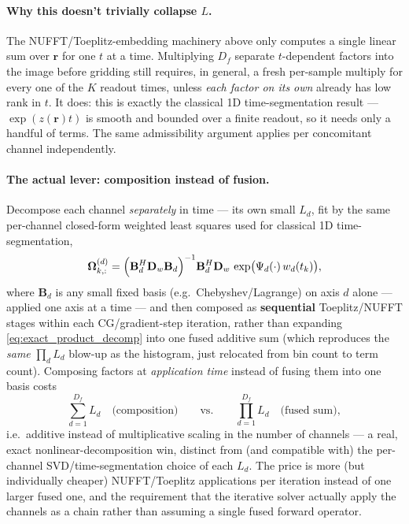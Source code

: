 \documentclass{article}
\begin{document}
\paragraph{Why this doesn't trivially collapse $L$.} The NUFFT/Toeplitz-embedding machinery above
only computes a single linear sum over $\mathbf{r}$ for one $t$ at a
time. Multiplying $D_f$ separate $t$-dependent factors into the image before gridding still
requires, in general, a fresh per-sample multiply for every one of the $K$ readout times, unless
\emph{each factor on its own} already has low rank in $t$. It does: this is exactly the classical
1D time-segmentation result — $\exp(z(\mathbf{r})t)$ is smooth and bounded over a finite readout,
so it needs only a handful of terms. The same admissibility argument applies per concomitant
channel independently.

\paragraph{The actual lever: composition instead of fusion.} Decompose each channel
\emph{separately} in time — its own small $L_d$, fit by the same per-channel closed-form
weighted least squares used for classical 1D time-segmentation,
\begin{equation}
    \boldsymbol\Omega^{(d)}_{k,:} = \Bigl(\mathbf{B}_d^H \mathbf{D}_w \mathbf{B}_d\Bigr)^{-1}
                                    \mathbf{B}_d^H \mathbf{D}_w\, \exp\bigl(\Psi_d(\cdot)\,w_d(t_k)\bigr),
    \label{eq:per_channel_fit}
\end{equation}
where $\mathbf{B}_d$ is any small fixed basis (e.g.\ Chebyshev/Lagrange) on axis $d$ alone —
applied one axis at a time — and then composed as
\textbf{sequential} Toeplitz/NUFFT stages within each CG/gradient-step iteration, rather than
expanding \eqref{eq:exact_product_decomp} into one fused additive sum (which reproduces the
\emph{same} $\prod_d L_d$ blow-up as the histogram, just relocated from bin count to term count).
Composing factors at \emph{application time} instead of fusing them into one basis costs
\begin{equation}
    \sum_{d=1}^{D_f} L_d \quad\text{(composition)} \qquad\text{vs.}\qquad \prod_{d=1}^{D_f} L_d \quad\text{(fused sum)},
    \label{eq:composition_vs_fusion}
\end{equation}
i.e.\ additive instead of multiplicative scaling in the number of channels — a real, exact
nonlinear-decomposition win, distinct from (and compatible with) the per-channel SVD/time-segmentation
choice of each $L_d$. The price is more (but individually cheaper) NUFFT/Toeplitz applications per
iteration instead of one larger fused one, and the requirement that the iterative solver actually
apply the channels as a chain rather than assuming a single fused forward operator.
\end{document}
